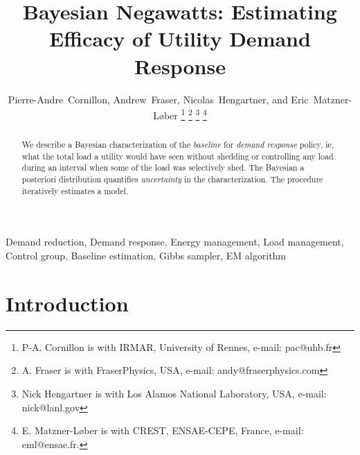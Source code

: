 \documentclass[journal]{IEEEtran}
\begin{document}
\title{Bayesian Negawatts: Estimating Efficacy of Utility Demand Response}

\author{
  Pierre-Andre~Cornillon,
  Andrew~Fraser,
  Nicolas~Hengartner,
  and Eric~Matzner-L{\o}ber
\thanks{P-A. Cornillon is with IRMAR, University of Rennes, e-mail: pac@uhb.fr}%
\thanks{A. Fraser is with FraserPhysics, USA, e-mail: andy@fraserphysics.com}%
\thanks{Nick Hengartner is with Los Alamos National Laboratory, USA,
  e-mail: nick@lanl.gov}%
\thanks{E. Matzner-L{\o}ber is with CREST, ENSAE-CEPE, France,
  e-mail: eml@ensae.fr.}
}
\maketitle

\begin{abstract}
  We describe a Bayesian characterization of the \emph{baseline} for
  \emph{demand response} policy, ie, what the total load a utility
  would have seen without shedding or controlling any load during an
  interval when some of the load was selectively shed.  The Bayesian a
  posteriori distribution quantifies \emph{uncertainty} in the
  characterization.  The procedure iteratively estimates a model.
\end{abstract}

\begin{IEEEkeywords}
Demand reduction, Demand response, Energy management, Load management,
Control group, Baseline estimation, Gibbs sampler, EM algorithm
\end{IEEEkeywords}

\IEEEpeerreviewmaketitle

\section{Introduction}
\label{sec:intro}
\end{document}
